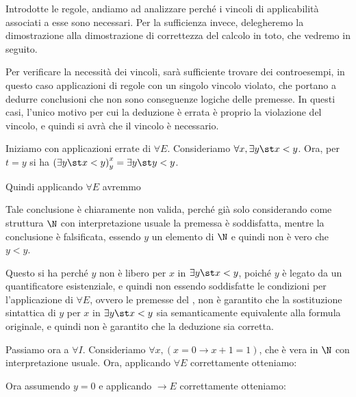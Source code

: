 Introdotte le regole, andiamo ad analizzare perché i vincoli di applicabilità associati a esse sono necessari. Per la sufficienza invece, delegheremo la dimostrazione alla dimostrazione di correttezza del calcolo in toto, che vedremo in seguito.

Per verificare la necessità dei vincoli, sarà sufficiente trovare dei controesempi, in questo caso applicazioni di regole con un singolo vincolo violato, che portano a dedurre conclusioni che non sono conseguenze logiche delle premesse. In questi casi, l'unico motivo per cui la deduzione è errata è proprio la violazione del vincolo, e quindi si avrà che il vincolo è necessario.

Iniziamo con applicazioni errate di \(\forall E\). Consideriamo \(\forall x, \exists y\st x < y\). Ora, per \(t=y\) si ha \(\subs{\exists y\st x < y}{x}{y} = \exists y\st y < y\).

Quindi applicando \(\forall E\) avremmo

\begin{prooftree}
\end{prooftree}

Tale conclusione è chiaramente non valida, perché già solo considerando come struttura \(\N\) con interpretazione usuale la premessa è soddisfatta, mentre la conclusione è falsificata, essendo \(y\) un elemento di \(\N\) e quindi non è vero che \(y < y\).

Questo si ha perché \(y\) non è libero per \(x\) in \(\exists y\st x < y\), poiché \(y\) è legato da un quantificatore esistenziale, e quindi non essendo soddisfatte le condizioni per l'applicazione di \(\forall E\), ovvero le premesse del , non è garantito che la sostituzione sintattica di \(y\) per \(x\) in \(\exists y\st x < y\) sia semanticamente equivalente alla formula originale, e quindi non è garantito che la deduzione sia corretta.

Passiamo ora a \(\forall I\). Consideriamo \(\forall x, (x=0\to x+1=1)\), che è vera in \(\N\) con interpretazione usuale. Ora, applicando \(\forall E\) correttamente otteniamo:

\begin{prooftree}
\end{prooftree}

Ora assumendo \(y=0\) e applicando \(\to E\) correttamente otteniamo:

